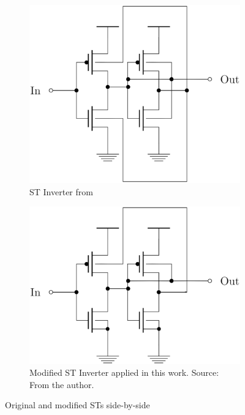 \documentclass[ecp,tc, english]{iiufrgs}
\begin{document}
\begin{figure}[H]
\centering
\begin{subfigure}{.5\textwidth}
  \centering
  \includegraphics[width=.8\linewidth]{STOriginal.eps}
  \caption{ST Inverter from \citet{dokania2015circuit}}
  \label{fig:sub1}
\end{subfigure}%
\begin{subfigure}{.5\textwidth}
  \centering
  \includegraphics[width=.8\linewidth]{STcorrigido.eps}
  \caption{Modified ST Inverter applied in this work. Source: From the author.}
  \label{fig:sub2}
\end{subfigure}
\caption{Original and modified STs side-by-side}
\label{fig:test}
\end{figure}
\end{document}

